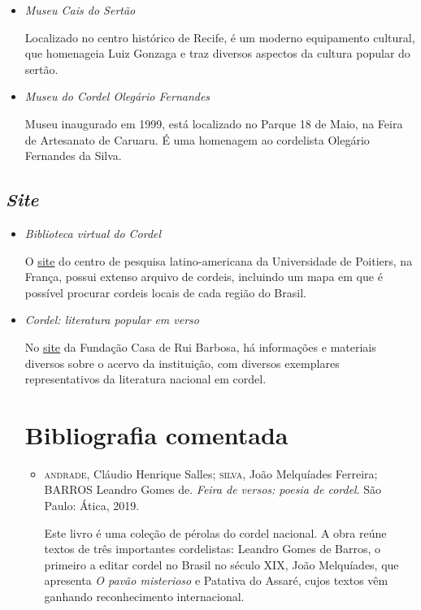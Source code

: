 \documentclass[12pt]{extarticle}
\begin{document}
\begin{itemize}
\begin{itemize}

\item \textit{Museu Cais do Sertão}

Localizado no centro histórico de Recife, é um moderno equipamento cultural, que homenageia Luiz Gonzaga e traz diversos aspectos da cultura popular do sertão.

\item \textit{Museu do Cordel Olegário Fernandes}

Museu inaugurado em 1999, está localizado no Parque 18 de Maio, na Feira de Artesanato de Caruaru. É uma homenagem ao cordelista Olegário Fernandes da Silva.

\end{itemize}

\subsection{\emph{Site}}

\begin{itemize}

\item \textit{Biblioteca virtual do Cordel}

O \href{http://cordel.edel.univ-poitiers.fr}{site} do centro de pesquisa latino-americana da Universidade de Poitiers, na França, possui extenso arquivo de cordeis, incluindo um mapa em que é possível procurar cordeis locais de cada região do Brasil.

\item \textit{Cordel: literatura popular em verso }

No \href{http://www.casaruibarbosa.gov.br/cordel/acervo.html}{site} da Fundação Casa de Rui Barbosa, há informações e materiais diversos sobre o acervo da instituição, com diversos
exemplares representativos da literatura nacional em cordel.

\section{Bibliografia comentada}

\begin{itemize}

\item \textsc{andrade}, Cláudio Henrique Salles; \textsc{silva}, João Melquíades Ferreira;
  BARROS Leandro Gomes de. \textit{Feira de versos: poesia de cordel}.
  São Paulo: Ática, 2019.

Este livro é uma coleção de pérolas do cordel nacional. A obra reúne
textos de três importantes cordelistas: Leandro Gomes de Barros, o
primeiro a editar cordel no Brasil no século XIX, João Melquíades, que
apresenta \emph{O pavão misterioso} e Patativa do Assaré, cujos textos
vêm ganhando reconhecimento internacional.


\end{itemize}
\end{itemize}
\end{itemize}
\end{document}

